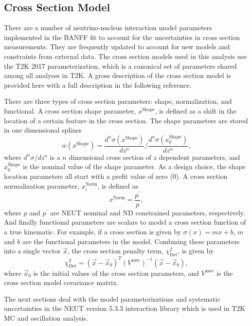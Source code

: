 \subsection{Cross Section Model}

There are a number of neutrino-nucleus interaction model parameters
implemented in the BANFF fit to account for the uncertainties in cross
section measurements. They are frequently updated to account for new
models and constraints from external data. The cross section models
used in this analysis use the T2K 2017 parameterization, which is
a canonical set of parameters shared among all analyses in T2K. A
gross description of the cross section model is provided here with
a full description in the following reference\cite{PhysRevLett.121.171802}.

There are three types of cross section parameters: shape, normalization,
and functional. A cross section shape parameter, $x^{\text{Shape}}$,
is defined as a shift in the location of a certain feature in the
cross section. The shape parameters are stored in one dimensional
splines 
\[
w\left(x^{\text{Shape}}\right)=\frac{d^{n}\sigma\left(x^{\text{Shape}}\right)}{dz^{n}}/\frac{d^{n}\sigma\left(x_{0}^{\text{Shape}}\right)}{dz^{n}},
\]
where $d^{n}\sigma/dz^{n}$ is a $n$ dimensional cross section of
$z$ dependent parameters, and $x_{0}^{\text{Shape}}$ is the nominal
value of the shape parameter. As a design choice, the shape location
parameters all start with a prefit value of zero (0). A cross section
normalization parameter, $x_{i}^{\text{Norm}}$, is defined as
\begin{equation}
x^{\text{Norm}}=\frac{p^{\prime}}{p},\label{eq:xsecnormdef}
\end{equation}
where $p$ and $p^{\prime}$ are NEUT nominal and ND constrained parameters,
respectively. And finally functional parameters are scalars to model
a cross section function of a true kinematic. For example, if a cross
section is given by $\sigma(x)=mx+b$, $m$ and $b$ are the functional
parameters in the model. Combining these parameters into a single
vector $\vec{x}$, the cross section penalty term, $\chi_{\text{Det}}^{2}$,
is given by
\[
\chi_{\text{Det}}^{2}=\left(\vec{x}-\vec{x}_{0}\right)^{T}\left(V^{\text{xsec}}\right)^{-1}\left(\vec{x}-\vec{x}_{0}\right),
\]
where $\vec{x}_{0}$ is the initial values of the cross section parameters,
and $V^{\text{xsec}}$ is the cross section model covariance matrix.

The next sections deal with the model parameterizations and systematic
uncertainties in the NEUT version 5.3.3\cite{Wret2019} interaction
library which is used in T2K MC and oscillation analysis.

